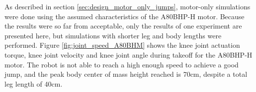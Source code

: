 As described in section \ref{sec:design_motor_only_jumps}, motor-only simulations were done using the assumed characteristics of the A80BHP-H motor. Because the results were so far from acceptable, only the results of one experiment are presented here, but simulations with shorter leg and body lengths were performed. Figure \ref{fig:joint_speed_A80BHM} shows the knee joint actuation torque, knee joint velocity and knee joint angle during takeoff for the A80BHP-H motor. The robot is not able to reach a high enough speed to achieve a good jump, and the peak body center of mass height reached is 70cm, despite a total leg length of 40cm.


